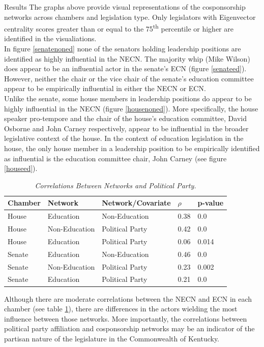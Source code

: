 \documentclass[final]{beamer}
\newlength{\twocolwid}
\begin{document}
\begin{frame}[t]
\begin{columns}[t]
\begin{column}{\twocolwid}
				\begin{alertblock}{Results}
					The graphs above provide visual representations of the cosponsorship networks across chambers and legislation type.  
					Only legislators with Eigenvector centrality scores greater than or equal to the 75\textsuperscript{th} percentile 
					or higher are identified in the visualiations. \\ 
					\vspace{0.5cm}
					In figure \ref{senatenoned} none of the senators holding leadership positions are identified as highly influential in the NECN.  	
					The majority whip (Mike Wilson) does appear to be an influential actor in the senate's ECN (figure \ref{senateed}).  
					However, neither the chair or the vice chair of the senate's education committee appear to be empirically influential in either 
					the NECN or ECN. \\
					\vspace{0.5cm}
					Unlike the senate, some house members in leadership positions do appear to be highly influential in the NECN 
					(figure \ref{housenoned}). 	More specifically, the house speaker pro-tempore and the chair of the house's education
					committee, David Osborne and John Carney respectively, appear to be influential in the broader legislative context 
					of the house.  In the context of education legislation in the house, the only house member in a leadership position
					to be empirically identified as influential is the education committee chair, John Carney (see figure \ref{houseed}). \\
					\begin{table}
						\caption{\textit{Correlations Between Networks and Political Party.} \label{results}}
						\begin{tabular}{l l l l l}
							\toprule
							\textbf{Chamber} & \textbf{Network} & \textbf{Network/Covariate} & \textbf{$\rho$} & \textbf{p-value} \\ 
							\midrule
							House & Education & Non-Education & 0.38 & 0.0 \\
							House & Non-Education & Political Party & 0.42 & 0.0 \\
							House & Education & Political Party & 0.06 & 0.014 \\
							Senate & Education & Non-Education & 0.46 & 0.0 \\
							Senate & Non-Education & Political Party & 0.23 & 0.002 \\
							Senate & Education & Political Party & 0.21 & 0.0 \\
							\bottomrule
						\end{tabular}
					\end{table}
					Although there are moderate correlations between the NECN and ECN in each chamber (see table \ref{results}), there 
					are differences in the actors wielding the most influence between those networks. More importantly, the correlations
					between political party affiliation and cosponsorship networks may be an indicator of the partisan nature of the 
					legislature in the Commonwealth of Kentucky.


\end{alertblock}
\end{column}
\end{columns}
\end{frame}
\end{document}
